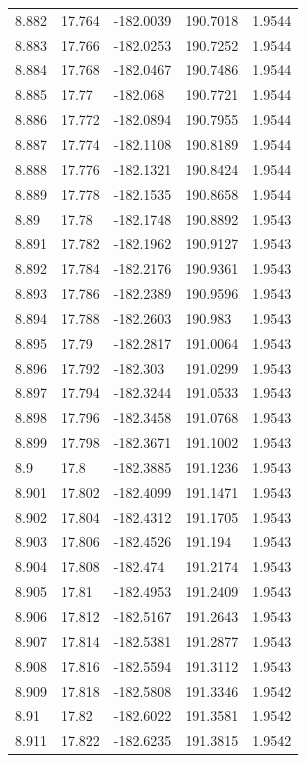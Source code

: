 \begin{tabular}{lllll}
8.882 & 17.764 & -182.0039 & 190.7018 & 1.9544 \\
8.883 & 17.766 & -182.0253 & 190.7252 & 1.9544 \\
8.884 & 17.768 & -182.0467 & 190.7486 & 1.9544 \\
8.885 & 17.77 & -182.068 & 190.7721 & 1.9544 \\
8.886 & 17.772 & -182.0894 & 190.7955 & 1.9544 \\
8.887 & 17.774 & -182.1108 & 190.8189 & 1.9544 \\
8.888 & 17.776 & -182.1321 & 190.8424 & 1.9544 \\
8.889 & 17.778 & -182.1535 & 190.8658 & 1.9544 \\
8.89 & 17.78 & -182.1748 & 190.8892 & 1.9543 \\
8.891 & 17.782 & -182.1962 & 190.9127 & 1.9543 \\
8.892 & 17.784 & -182.2176 & 190.9361 & 1.9543 \\
8.893 & 17.786 & -182.2389 & 190.9596 & 1.9543 \\
8.894 & 17.788 & -182.2603 & 190.983 & 1.9543 \\
8.895 & 17.79 & -182.2817 & 191.0064 & 1.9543 \\
8.896 & 17.792 & -182.303 & 191.0299 & 1.9543 \\
8.897 & 17.794 & -182.3244 & 191.0533 & 1.9543 \\
8.898 & 17.796 & -182.3458 & 191.0768 & 1.9543 \\
8.899 & 17.798 & -182.3671 & 191.1002 & 1.9543 \\
8.9 & 17.8 & -182.3885 & 191.1236 & 1.9543 \\
8.901 & 17.802 & -182.4099 & 191.1471 & 1.9543 \\
8.902 & 17.804 & -182.4312 & 191.1705 & 1.9543 \\
8.903 & 17.806 & -182.4526 & 191.194 & 1.9543 \\
8.904 & 17.808 & -182.474 & 191.2174 & 1.9543 \\
8.905 & 17.81 & -182.4953 & 191.2409 & 1.9543 \\
8.906 & 17.812 & -182.5167 & 191.2643 & 1.9543 \\
8.907 & 17.814 & -182.5381 & 191.2877 & 1.9543 \\
8.908 & 17.816 & -182.5594 & 191.3112 & 1.9543 \\
8.909 & 17.818 & -182.5808 & 191.3346 & 1.9542 \\
8.91 & 17.82 & -182.6022 & 191.3581 & 1.9542 \\
8.911 & 17.822 & -182.6235 & 191.3815 & 1.9542 \\

\end{tabular}
